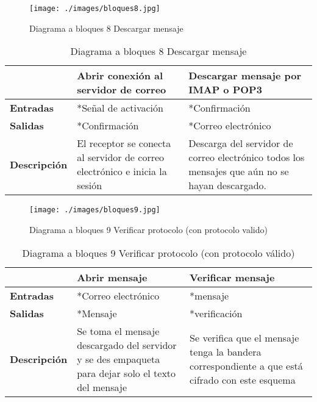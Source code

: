 \documentclass[12pt,oneside,onecolumn,openany]{report}
\begin{document}
\pagebreak
\begin{figure}[H]
	\texttt{[image: ./images/bloques8.jpg]}
	\caption{Diagrama a bloques 8 Descargar mensaje}
	\label{fig:5-8-1}
\end{figure}
\begin{table}[H]
 \centering
   {
     \begin{tabular}{| p{3cm} | p{4cm} | p{4cm} |}
     \hline
     & \textbf{Abrir conexión al servidor de correo} & \textbf{Descargar mensaje por IMAP o POP3}\\
     \hline
     \textbf{Entradas} & *Señal de activación & *Confirmación\\
     \hline
     \textbf{Salidas} & *Confirmación & *Correo electrónico\\
     \hline
     \textbf{Descripción} & El receptor se conecta al servidor de correo electrónico e inicia la sesión & Descarga del servidor de correo electrónico todos los mensajes que aún no se hayan descargado.\\

    \end{tabular}
    }
    \caption{Diagrama a bloques 8 Descargar mensaje}
    \label{tabla:b8}
\end{table}
\begin{figure}[H]
	\texttt{[image: ./images/bloques9.jpg]}
	\caption{Diagrama a bloques 9 Verificar protocolo (con protocolo valido)}
	\label{fig:5-9-1}
\end{figure}
\begin{table}[H]
 \centering
   {
     \begin{tabular}{| p{3cm} | p{4cm} | p{4cm} |}
     \hline
     & \textbf{Abrir mensaje} & \textbf{Verificar mensaje}\\
     \hline
     \textbf{Entradas} & *Correo electrónico & *mensaje\\
     \hline
     \textbf{Salidas} & *Mensaje & *verificación\\
     \hline
     \textbf{Descripción} & Se toma el mensaje descargado del servidor y se des empaqueta para dejar solo el texto del mensaje & Se verifica que el mensaje tenga la bandera correspondiente a que está cifrado con este esquema\\

    \end{tabular}
    }
    \caption{Diagrama a bloques 9 Verificar protocolo (con protocolo válido)}
    \label{tabla:b9}
\end{table}
\end{document}
